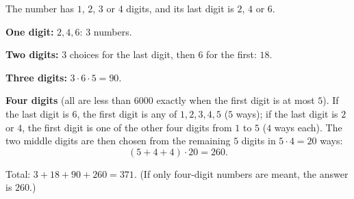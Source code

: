 The number has $1$, $2$, $3$ or $4$ digits, and its last digit is $2$, $4$ or $6$.

\textbf{One digit:} $2,4,6$: $3$ numbers.

\textbf{Two digits:} $3$ choices for the last digit, then $6$ for the first: $18$.

\textbf{Three digits:} $3\cdot6\cdot5=90$.

\textbf{Four digits} (all are less than $6000$ exactly when the first digit is at most $5$). If the last digit is $6$, the first digit is any of $1,2,3,4,5$ ($5$ ways); if the last digit is $2$ or $4$, the first digit is one of the other four digits from $1$ to $5$ ($4$ ways each). The two middle digits are then chosen from the remaining $5$ digits in $5\cdot4=20$ ways:
\[
(5+4+4)\cdot20=260 .
\]

Total: $3+18+90+260=\boxed{371}$. (If only four-digit numbers are meant, the answer is $260$.)
